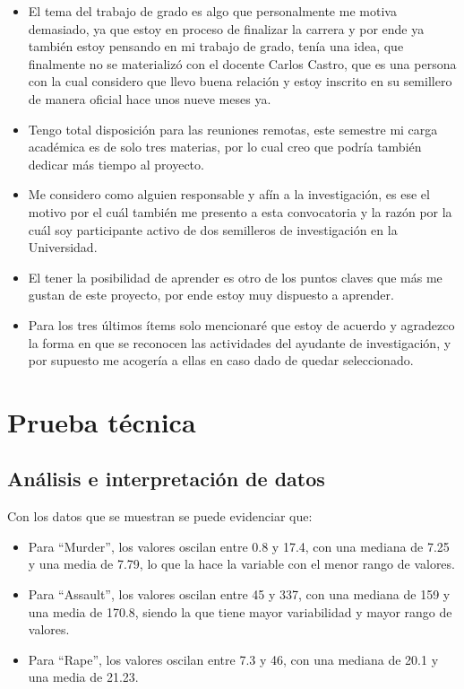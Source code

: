 \documentclass[12pt]{article}
\begin{document}
\begin{itemize}
    \item El tema del trabajo de grado es algo que personalmente me motiva demasiado, ya que estoy en proceso de finalizar la carrera y por ende ya también estoy pensando en mi trabajo de grado, tenía una idea, que finalmente no se materializó con el docente Carlos Castro, que es una persona con la cual considero que llevo buena relación y estoy inscrito en su semillero de manera oficial hace unos nueve meses ya.
    \item Tengo total disposición para las reuniones remotas, este semestre mi carga académica es de solo tres materias, por lo cual creo que podría también dedicar más tiempo al proyecto.
    \item Me considero como alguien responsable y afín a la investigación, es ese el motivo por el cuál también me presento a esta convocatoria y la razón por la cuál soy participante activo de dos semilleros de investigación en la Universidad.
    \item El tener la posibilidad de aprender es otro de los puntos claves que más me gustan de este proyecto, por ende estoy muy dispuesto a aprender.
    \item Para los tres últimos ítems solo mencionaré que estoy de acuerdo y agradezco la forma en que se reconocen las actividades del ayudante de investigación, y por supuesto me acogería a ellas en caso dado de quedar seleccionado.
\end{itemize}

\section{Prueba técnica}
\subsection{Análisis e interpretación de datos}

Con los datos que se muestran se puede evidenciar que:  

\begin{itemize}
    \item Para “Murder”, los valores oscilan entre 0.8 y 17.4, con una mediana de 7.25 y una media de 7.79, lo que la hace la variable con el menor rango de valores.
    \item Para “Assault”, los valores oscilan entre 45 y 337, con una mediana de 159 y una media de 170.8, siendo la que tiene mayor variabilidad y mayor rango de valores.
    \item Para “Rape”, los valores oscilan entre 7.3 y 46, con una mediana de 20.1 y una media de 21.23.
\end{itemize}
\end{document}
